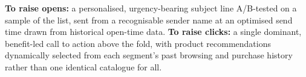 \begin{qlist}
\textbf{To raise opens:} a personalised, urgency-bearing subject line
A/B-tested on a sample of the list, sent from a recognisable sender name at an
optimised send time drawn from historical open-time data. \textbf{To raise
clicks:} a single dominant, benefit-led call to action above the fold, with
product recommendations dynamically selected from each segment's past browsing
and purchase history rather than one identical catalogue for all.

\end{qlist}

\partb

